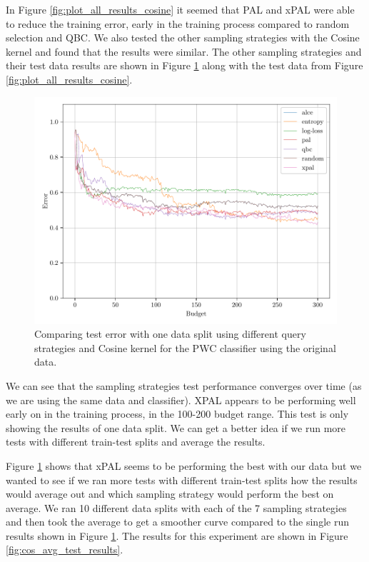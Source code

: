 In Figure \ref{fig:plot_all_results_cosine} it seemed that PAL and xPAL were able to reduce the training error, early in the training process compared to random selection and QBC. We also tested the other sampling strategies with the Cosine kernel and found that the results were similar. The other sampling strategies and their test data results are shown in Figure \ref{fig:cos_test_results} along with the test data from Figure \ref{fig:plot_all_results_cosine}. 


\begin{figure}[ht]
    \centering
    \includegraphics[width=\scale\textwidth]{../img/plot_text_data_original_compare_stratagies_test_results.pdf}
    \caption{Comparing test error with one data split using different query strategies and Cosine kernel for the PWC classifier using the original data.}
    \label{fig:cos_test_results}
\end{figure}

We can see that the sampling strategies test performance converges over time (as we are using the same data and classifier). XPAL appears to be performing well early on in the training process, in the 100-200 budget range. This test is only showing the results of one data split. We can get a better idea if we run more tests with different train-test splits and average the results.

Figure \ref{fig:cos_test_results} shows that xPAL seems to be performing the best with our data but we wanted to see if we ran more tests with different train-test splits how the results would average out and which sampling strategy would perform the best on average. We ran 10 different data splits with each of the 7 sampling strategies and then took the average to get a smoother curve compared to the single run results shown in Figure \ref{fig:cos_test_results}. The results for this experiment are shown in Figure \ref{fig:cos_avg_test_results}. 

